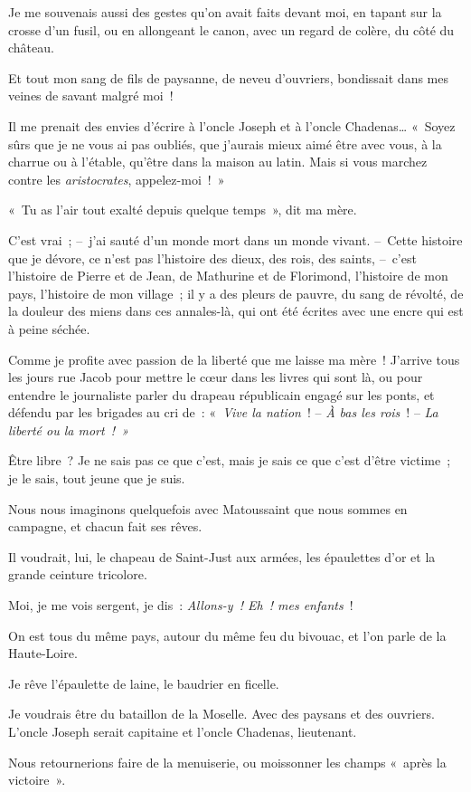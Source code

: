 \documentclass[french,twoside]{book} %
\begin{document}
Je me souvenais aussi des gestes qu’on avait faits devant moi, en tapant sur la crosse d’un fusil, ou en allongeant le canon, avec un regard de colère, du côté du château.\par
Et tout mon sang de fils de paysanne, de neveu d’ouvriers, bondissait dans mes veines de savant malgré moi !\par
Il me prenait des envies d’écrire à l’oncle Joseph et à l’oncle Chadenas… « Soyez sûrs que je ne vous ai pas oubliés, que j’aurais mieux aimé être avec vous, à la charrue ou à l’étable, qu’être dans la maison au latin. Mais si vous marchez contre les \emph{aristocrates}, appelez-moi ! »\par
\bigbreak
\noindent « Tu as l’air tout exalté depuis quelque temps », dit ma mère.\par
C’est vrai ; – j’ai sauté d’un monde mort dans un monde vivant. – Cette histoire que je dévore, ce n’est pas l’histoire des dieux, des rois, des saints, – c’est l’histoire de Pierre et de Jean, de Mathurine et de Florimond, l’histoire de mon pays, l’histoire de mon village ; il y a des pleurs de pauvre, du sang de révolté, de la douleur des miens dans ces annales-là, qui ont été écrites avec une encre qui est à peine séchée.\par
\bigbreak
\noindent Comme je profite avec passion de la liberté que me laisse ma mère ! J’arrive tous les jours rue Jacob pour mettre le cœur dans les livres qui sont là, ou pour entendre le journaliste parler du drapeau républicain engagé sur les ponts, et défendu par les brigades au cri de : « \emph{Vive la nation} ! – \emph{À bas les rois} ! – \emph{La liberté ou la mort ! »}\par
Être libre ? Je ne sais pas ce que c’est, mais je sais ce que c’est d’être victime ; je le sais, tout jeune que je suis.\par
\bigbreak
\noindent Nous nous imaginons quelquefois avec Matoussaint que nous sommes en campagne, et chacun fait ses rêves.\par
Il voudrait, lui, le chapeau de Saint-Just aux armées, les épaulettes d’or et la grande ceinture tricolore.\par
Moi, je me vois sergent, je dis : \emph{Allons-y ! Eh ! mes enfants} !\par
On est tous du même pays, autour du même feu du bivouac, et l’on parle de la Haute-Loire.\par
Je rêve l’épaulette de laine, le baudrier en ficelle.\par
Je voudrais être du bataillon de la Moselle. Avec des paysans et des ouvriers. L’oncle Joseph serait capitaine et l’oncle Chadenas, lieutenant.\par
Nous retournerions faire de la menuiserie, ou moissonner les champs « après la victoire ».\par
\bigbreak
\end{document}
